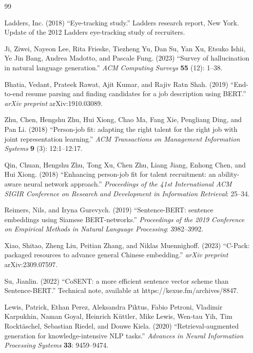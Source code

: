 \documentclass[3p,times,procedia]{elsarticle}
\begin{document}
\begin{thebibliography}{99}

Ladders, Inc. (2018) ``Eye-tracking study.'' Ladders research report, New York. Update of the 2012 Ladders eye-tracking study of recruiters.

Ji, Ziwei, Nayeon Lee, Rita Frieske, Tiezheng Yu, Dan Su, Yan Xu, Etsuko Ishii, Ye Jin Bang, Andrea Madotto, and Pascale Fung. (2023) ``Survey of hallucination in natural language generation.'' {\it ACM Computing Surveys} {\bf 55} (12): 1--38.

Bhatia, Vedant, Prateek Rawat, Ajit Kumar, and Rajiv Ratn Shah. (2019) ``End-to-end resume parsing and finding candidates for a job description using BERT.'' {\it arXiv preprint} arXiv:1910.03089.

Zhu, Chen, Hengshu Zhu, Hui Xiong, Chao Ma, Fang Xie, Pengliang Ding, and Pan Li. (2018) ``Person-job fit: adapting the right talent for the right job with joint representation learning.'' {\it ACM Transactions on Management Information Systems} {\bf 9} (3): 12:1--12:17.

Qin, Chuan, Hengshu Zhu, Tong Xu, Chen Zhu, Liang Jiang, Enhong Chen, and Hui Xiong. (2018) ``Enhancing person-job fit for talent recruitment: an ability-aware neural network approach.'' {\it Proceedings of the 41st International ACM SIGIR Conference on Research and Development in Information Retrieval}: 25--34.

Reimers, Nils, and Iryna Gurevych. (2019) ``Sentence-BERT: sentence embeddings using Siamese BERT-networks.'' {\it Proceedings of the 2019 Conference on Empirical Methods in Natural Language Processing}: 3982--3992.

Xiao, Shitao, Zheng Liu, Peitian Zhang, and Niklas Muennighoff. (2023) ``C-Pack: packaged resources to advance general Chinese embedding.'' {\it arXiv preprint} arXiv:2309.07597.

Su, Jianlin. (2022) ``CoSENT: a more efficient sentence vector scheme than Sentence-BERT.'' Technical note, available at https://kexue.fm/archives/8847.

Lewis, Patrick, Ethan Perez, Aleksandra Piktus, Fabio Petroni, Vladimir Karpukhin, Naman Goyal, Heinrich K\"{u}ttler, Mike Lewis, Wen-tau Yih, Tim Rockt\"{a}schel, Sebastian Riedel, and Douwe Kiela. (2020) ``Retrieval-augmented generation for knowledge-intensive NLP tasks.'' {\it Advances in Neural Information Processing Systems} {\bf 33}: 9459--9474.


\end{thebibliography}
\end{document}
